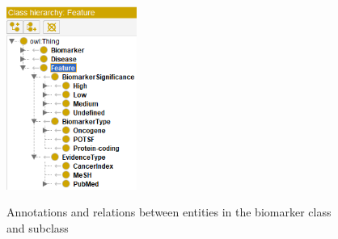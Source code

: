 \begin{figure}[h]
	\centering
		\includegraphics[width=0.3\linewidth,height=60mm]{images/feature_class.png}
        \label{fig:biomarker_subclass}
	\caption{Annotations and relations between entities in the biomarker class and subclass}
	\vspace{-2mm}
\end{figure}

